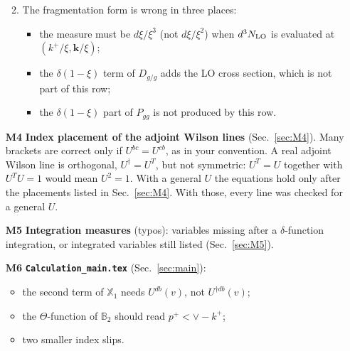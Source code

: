 \documentclass[10pt]{article}
\numberwithin{equation}{section}
\def\mf#1{\mathbb{#1}}
\begin{document}
\begin{enumerate}
\begin{enumerate}
\begin{itemize}
\end{itemize}
\item The fragmentation form is wrong in three places:
\begin{itemize}
\item the measure must be $d\xi/\xi^3$ (not $d\xi/\xi^2$) when $d^3N_{\rm LO}$ is evaluated at $(k^+/\xi,\mathbf k/\xi)$;
\item the $\delta(1-\xi)$ term of $D_{g/g}$ adds the LO cross section, which is not part of this row;
\item the $\delta(1-\xi)$ part of $P_{gg}$ is not produced by this row.
\end{itemize}
\end{enumerate}
\item[\textbf{M4}] \textbf{Index placement of the adjoint Wilson lines} (Sec.~\ref{sec:M4}). Many brackets are correct only if $U^{bc}=U^{cb}$, as in your convention. A real adjoint Wilson line is orthogonal, $U^\dagger=U^T$, but not symmetric: $U^T=U$ together with $U^TU=1$ would mean $U^2=1$. With a general $U$ the equations hold only after the placements listed in Sec.~\ref{sec:M4}. With those, every line was checked for a general $U$.
\item[\textbf{M5}] \textbf{Integration measures} (typos): variables missing after a $\delta$-function integration, or integrated variables still listed (Sec.~\ref{sec:M5}).
\item[\textbf{M6}] \textbf{\texttt{Calculation\_main.tex}} (Sec.~\ref{sec:main}):
\begin{itemize}
\item the second term of $\mathbb X_1$ needs $U^{db}(v)$, not $U^{\dagger db}(v)$;
\item the $\Theta$-function of $\mf B_2$ should read $p^+<\vee-k^+$;
\item two smaller index slips.
\end{itemize}
\end{enumerate}

\end{document}
